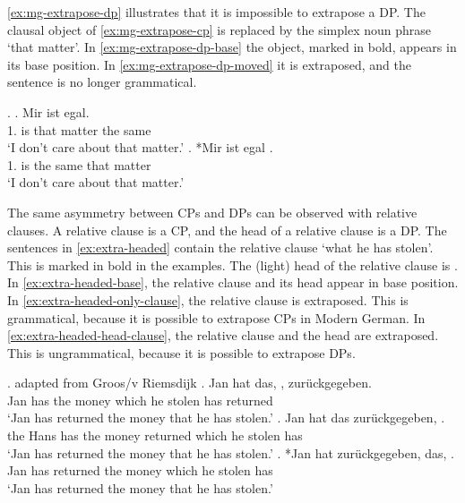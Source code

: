 \ref{ex:mg-extrapose-dp} illustrates that it is impossible to extrapose a DP. The clausal object of \ref{ex:mg-extrapose-cp} is replaced by the simplex noun phrase  `that matter'.
In \ref{ex:mg-extrapose-dp-base} the object, marked in bold, appears in its base position. In \ref{ex:mg-extrapose-dp-moved} it is extraposed, and the sentence is no longer grammatical.

\ex.\label{ex:mg-extrapose-dp}
\ag. Mir ist   egal.\\
 1. is that matter {the same}\\
 `I don't care about that matter.' \label{ex:mg-extrapose-dp-base}
\bg. *Mir ist egal  .\\
 1. is {the same} that matter\\
 `I don't care about that matter.' \label{ex:mg-extrapose-dp-moved}

The same asymmetry between CPs and DPs can be observed with relative clauses. A relative clause is a CP, and the head of a relative clause is a DP. The sentences in \ref{ex:extra-headed} contain the relative clause  `what he has stolen'. This is marked in bold in the examples. The (light) head of the relative clause is .
In \ref{ex:extra-headed-base}, the relative clause and its head appear in base position. In \ref{ex:extra-headed-only-clause}, the relative clause is extraposed. This is grammatical, because it is possible to extrapose CPs in Modern German. In \ref{ex:extra-headed-head-clause}, the relative clause and the head are extraposed. This is ungrammatical, because it is possible to extrapose DPs.

\ex. \label{ex:extra-headed} adapted from Groos/v Riemsdijk
\ag. Jan hat das,    , zurückgegeben.\\
Jan has the money which he stolen has returned\\
\glt `Jan has returned the money that he has stolen.'\label{ex:extra-headed-base}
\bg. Jan hat das zurückgegeben,    .\\
the Hans has the money returned which he stolen has\\
\glt `Jan has returned the money that he has stolen.'\label{ex:extra-headed-only-clause}
\cg. *Jan hat zurückgegeben, das,    .\\
Jan has returned the money which he stolen has\\
\glt `Jan has returned the money that he has stolen.'\label{ex:extra-headed-head-clause}

